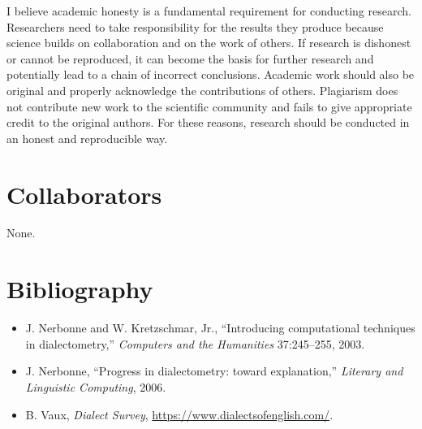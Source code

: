 \documentclass[10pt,letterpaper]{article}
\begin{document}
I believe academic honesty is a fundamental requirement for conducting research. Researchers need to take responsibility for the results they produce because science builds on collaboration and on the work of others. If research is dishonest or cannot be reproduced, it can become the basis for further research and potentially lead to a chain of incorrect conclusions. Academic work should also be original and properly acknowledge the contributions of others. Plagiarism does not contribute new work to the scientific community and fails to give appropriate credit to the original authors. For these reasons, research should be conducted in an honest and reproducible way.

\section{Collaborators}\label{collaborators}

None.


\section*{Bibliography}
\begin{itemize}
\item J. Nerbonne and W. Kretzschmar, Jr., ``Introducing computational
techniques in dialectometry,'' \textit{Computers and the Humanities}
37:245--255, 2003.
\item J. Nerbonne, ``Progress in dialectometry: toward explanation,''
\textit{Literary and Linguistic Computing}, 2006.
\item B. Vaux, \emph{Dialect Survey}, \url{https://www.dialectsofenglish.com/}.
\end{itemize}
\end{document}
